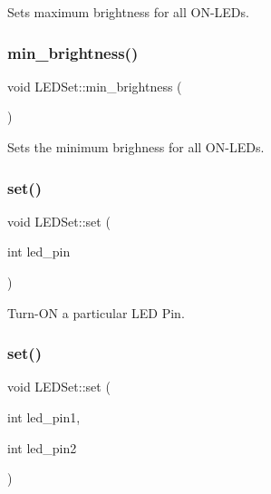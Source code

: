 Sets maximum brightness for all O\+N-\/\+L\+E\+Ds. 

\mbox{\label{classLEDSet_a2f050dc20669252885e36f26a3af6a1d}} 
\subsubsection{\texorpdfstring{min\+\_\+brightness()}{min\_brightness()}}
{\footnotesize\ttfamily void L\+E\+D\+Set\+::min\+\_\+brightness (\begin{DoxyParamCaption}{ }\end{DoxyParamCaption})\hspace{0.3cm}{\ttfamily [inline]}}

Sets the minimum brighness for all O\+N-\/\+L\+E\+Ds. \mbox{\label{classLEDSet_a187d19565bbb09a168635b384acc5dd7}} 
\subsubsection{\texorpdfstring{set()}{set()}\hspace{0.1cm}{\footnotesize\ttfamily [1/3]}}
{\footnotesize\ttfamily void L\+E\+D\+Set\+::set (\begin{DoxyParamCaption}\item[{int}]{led\+\_\+pin }\end{DoxyParamCaption})\hspace{0.3cm}{\ttfamily [inline]}}



Turn-\/\+ON a particular L\+ED Pin. 

\mbox{\label{classLEDSet_a8462339dbc47f4d979c9f783b8532d4f}} 
\subsubsection{\texorpdfstring{set()}{set()}\hspace{0.1cm}{\footnotesize\ttfamily [2/3]}}
{\footnotesize\ttfamily void L\+E\+D\+Set\+::set (\begin{DoxyParamCaption}\item[{int}]{led\+\_\+pin1,  }\item[{int}]{led\+\_\+pin2 }\end{DoxyParamCaption})\hspace{0.3cm}{\ttfamily [inline]}}



